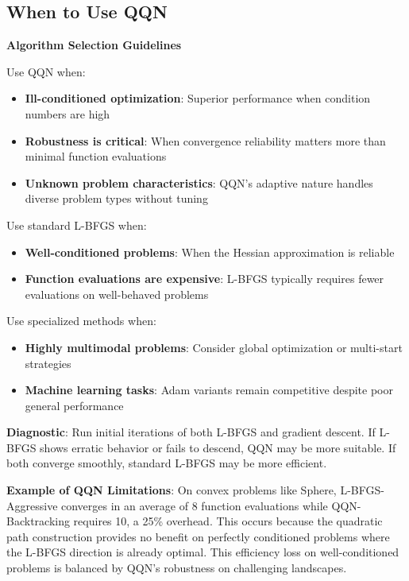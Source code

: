 \hypertarget{when-to-use-qqn}{%
\subsection{When to Use QQN}\label{when-to-use-qqn}}

\textbf{Algorithm Selection Guidelines}

Use QQN when:

\begin{itemize}
\tightlist
\item
  \textbf{Ill-conditioned optimization}: Superior performance when condition numbers are high
\item
  \textbf{Robustness is critical}: When convergence reliability matters more than minimal function evaluations
\item
  \textbf{Unknown problem characteristics}: QQN's adaptive nature handles diverse problem types without tuning
\end{itemize}

Use standard L-BFGS when:

\begin{itemize}
\tightlist
\item
  \textbf{Well-conditioned problems}: When the Hessian approximation is reliable
\item
  \textbf{Function evaluations are expensive}: L-BFGS typically requires fewer evaluations on well-behaved problems
\end{itemize}

Use specialized methods when:

\begin{itemize}
\tightlist
\item
  \textbf{Highly multimodal problems}: Consider global optimization or multi-start strategies
\item
  \textbf{Machine learning tasks}: Adam variants remain competitive despite poor general performance
\end{itemize}

\textbf{Diagnostic}: Run initial iterations of both L-BFGS and gradient descent. If L-BFGS shows erratic behavior or fails to descend, QQN may be more suitable. If both converge smoothly, standard L-BFGS may be more efficient.

\textbf{Example of QQN Limitations}: On convex problems like Sphere, L-BFGS-Aggressive converges in an average of 8 function evaluations while QQN-Backtracking requires 10, a 25\% overhead. This occurs because the quadratic path construction provides no benefit on perfectly conditioned problems where the L-BFGS direction is already optimal.
This efficiency loss on well-conditioned problems is balanced by QQN's robustness on challenging landscapes.

